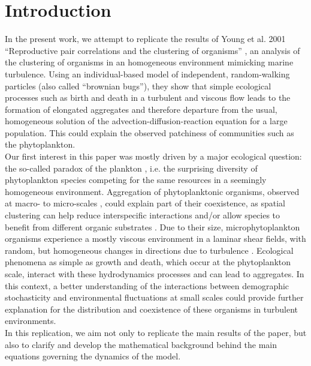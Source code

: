 
\section*{Introduction}

In the present work, we attempt to replicate the results of Young et al. 2001 ``Reproductive pair correlations and the clustering of organisms'' \cite{young_reproductive_2001}, an analysis of the clustering of organisms in an homogeneous environment mimicking marine turbulence. Using an individual-based model of independent, random-walking particles (also called ``brownian bugs''), they show that simple ecological processes such as birth and death in a turbulent and viscous flow leads to the formation of elongated aggregates and therefore departure from the usual, homogeneous solution of the advection-diffusion-reaction equation for a large population. This could explain the observed patchiness of communities such as the phytoplankton. \\

Our first interest in this paper was mostly driven by a major ecological question: the so-called paradox of the plankton \citep{hutchinson_paradox_1961}, i.e. the surprising diversity of phytoplankton species competing for the same resources in a seemingly homogeneous environment. Aggregation of phytoplanktonic organisms, observed at macro- to micro-scales \citep{lovejoy_universal_2001,pinel2007spatial}, could explain part of their coexistence, as spatial clustering can help reduce interspecific interactions \citep{font-munoz_advection_2017} and/or allow species to benefit from different organic substrates \citep{seymour_resource_2009}. Due to their size, microphytoplankton organisms experience a mostly viscous environment in a laminar shear fields, with random, but homogeneous changes in directions due to turbulence \citep{peters_effects_2000}. Ecological phenomena as simple as growth and death, which occur at the phytoplankton scale, interact with these hydrodynamics processes and can lead to aggregates. In this context, a better understanding of the interactions between demographic stochasticity and environmental fluctuations at small scales could provide further explanation for the distribution and coexistence of these organisms in turbulent environments. \\

In this replication, we aim not only to replicate the main results of the paper, but also to clarify and develop the mathematical background behind the main equations governing the dynamics of the model. 
 
